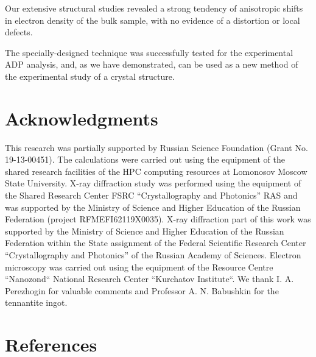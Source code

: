 \documentclass[preprint,review,12pt]{elsarticle}
\begin{document}
Our extensive structural studies revealed a strong tendency of anisotropic shifts in electron density of the bulk sample, with no evidence of a distortion or local defects.

The specially-designed technique was successfully tested for the experimental ADP analysis, and, as we have demonstrated, can be used as a new method of the experimental study of a crystal structure.

\section{Acknowledgments}\label{sec:level1}
This research was partially supported by Russian Science Foundation (Grant No. 19-13-00451). The calculations were carried out using the equipment of the shared research facilities of the HPC computing resources at Lomonosov Moscow State University.
X-ray diffraction study was performed using the equipment of the Shared Research Center FSRC “Crystallography and Photonics” RAS and was supported by the Ministry of  Science and Higher Education of the Russian Federation (project RFMEFI62119X0035). X-ray diffraction part of this work was supported by the Ministry of Science and Higher Education of the Russian Federation within the State assignment  of the Federal Scientific Research Center “Crystallography and Photonics” of the Russian Academy of Sciences.
Electron microscopy was carried out using the equipment of the Resource Centre “Nanozond“
National Research Center “Kurchatov Institute“.
We thank I. A. Perezhogin for valuable comments and  Professor A. N. Babushkin for the tennantite ingot.


\section{References}\label{sec:level1}


\end{document}
